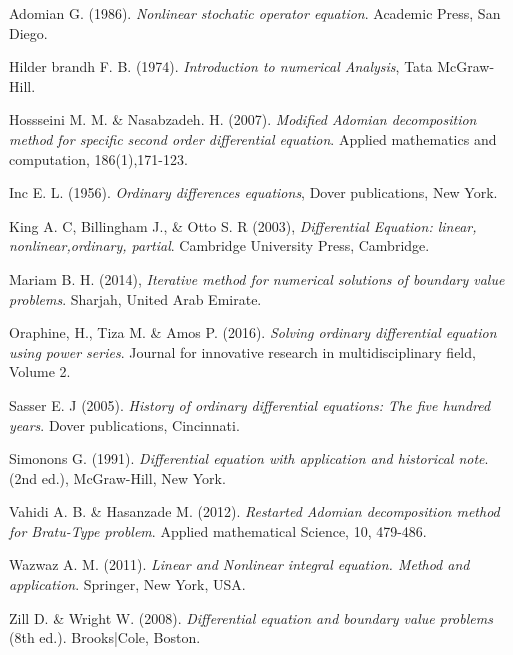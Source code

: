 \documentclass[11pt]{report}
\begin{document}
	\begin{description}
		\item Adomian G. (1986). \emph{Nonlinear stochatic operator equation}. Academic Press, San Diego.
		
		\item Hilder brandh F. B. (1974). \emph{Introduction to numerical Analysis}, Tata McGraw-Hill.
		
		\item Hossseini M. M. \& Nasabzadeh. H. (2007). \emph{Modified Adomian decomposition method for specific second order differential equation}. Applied mathematics and computation, 186(1),171-123.
		
		\item Inc E. L. (1956). \emph{Ordinary differences equations}, Dover publications, New York.
		
		\item King A. C, Billingham J., \& Otto S. R (2003), \emph{Differential Equation: linear, nonlinear,ordinary, partial}. Cambridge University Press, Cambridge.
		
		\item Mariam B. H. (2014), \emph{Iterative method for numerical solutions of boundary value problems}. Sharjah, United Arab Emirate.
		
		\item Oraphine, H., Tiza M. \& Amos P. (2016). \emph{Solving ordinary differential equation using power series}. Journal for innovative research in multidisciplinary field, Volume 2.
		
		\item Sasser E. J (2005). \emph{History of ordinary differential equations: The five hundred years}. Dover publications, Cincinnati.
		
		\item Simonons G. (1991). \emph{Differential equation with application and historical note}. (2nd ed.), McGraw-Hill, New York. 
		
		\item Vahidi A. B. \& Hasanzade M. (2012). \emph{Restarted Adomian decomposition method for Bratu-Type problem}. Applied mathematical Science, 10, 479-486.
		
		\item Wazwaz A. M. (2011). \emph{Linear and Nonlinear integral equation. Method and application}. Springer, New York, USA.
		
		\item Zill D. \& Wright W. (2008). \emph{Differential equation and boundary value problems} (8th ed.). Brooks|Cole, Boston.
	\end{description}
	
\end{document}
